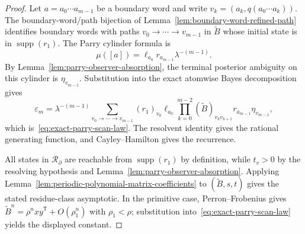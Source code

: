 \begin{proof}
Let $a=a_0\cdots a_{m-1}$ be a boundary word and write
$v_k=(a_k,q(a_0\cdots a_k))$.  The boundary-word/path bijection of
Lemma~\ref{lem:boundary-word-refined-path} identifies boundary words with
paths $v_0\to\cdots\to v_{m-1}$ in $\widetilde B$ whose initial state is in
$\operatorname{supp}(r_1)$.  The Parry cylinder formula is
\[
\mu([a])=\ell_{a_0}r_{a_{m-1}}\lambda^{-(m-1)}.
\]
By Lemma~\ref{lem:parry-observer-absorption}, the terminal posterior ambiguity
on this cylinder is $\eta_{v_{m-1}}$.  Substitution into the exact atomwise
Bayes decomposition gives
\[
\varepsilon_m
=\lambda^{-(m-1)}
\sum_{v_0\to\cdots\to v_{m-1}}
 (r_1)_{v_0}\ell_{a_0}
 \prod_{k=0}^{m-2}(\widetilde B)_{v_kv_{k+1}}
 r_{a_{m-1}}\eta_{v_{m-1}},
\]
which is~\eqref{eq:exact-parry-scan-law}.  The resolvent identity gives the
rational generating function, and Cayley--Hamilton gives the recurrence.

All states in $\mathcal R_\partial$ are reachable from
$\operatorname{supp}(r_1)$ by definition, while $t_v>0$ by the resolving
hypothesis and Lemma~\ref{lem:parry-observer-absorption}.  Applying
Lemma~\ref{lem:periodic-polynomial-matrix-coefficients} to
$(\widetilde B,s,t)$ gives the stated residue-class asymptotic.  In the
primitive case, Perron--Frobenius gives
$\widetilde B^n=\rho^nxy^{\mathsf T}+O(\rho_1^n)$ with $\rho_1<\rho$;
substitution into~\eqref{eq:exact-parry-scan-law} yields the displayed
constant.
\end{proof}

